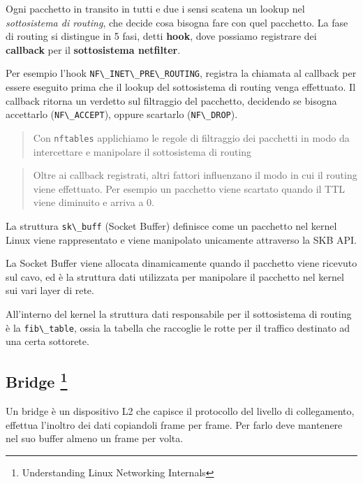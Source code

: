 Ogni pacchetto in transito in tutti e due i sensi scatena un lookup nel
\emph{sottosistema di routing}, che decide cosa bisogna fare con quel
pacchetto. La fase di routing si distingue in 5 fasi, detti
\textbf{hook}, dove possiamo registrare dei \textbf{callback} per il
\textbf{sottosistema netfilter}.

Per esempio l'hook \passthrough{\lstinline!NF\_INET\_PRE\_ROUTING!},
registra la chiamata al callback per essere eseguito prima che il lookup
del sottosistema di routing venga effettuato. Il callback ritorna un
verdetto sul filtraggio del pacchetto, decidendo se bisogna accettarlo
(\passthrough{\lstinline!NF\_ACCEPT!}), oppure scartarlo
(\passthrough{\lstinline!NF\_DROP!}).

\begin{quote}
Con \passthrough{\lstinline!nftables!} applichiamo le regole di
filtraggio dei pacchetti in modo da intercettare e manipolare il
sottosistema di routing
\end{quote}

\begin{quote}
Oltre ai callback registrati, altri fattori influenzano il modo in cui
il routing viene effettuato. Per esempio un pacchetto viene scartato
quando il TTL viene diminuito e arriva a 0.
\end{quote}

La struttura \passthrough{\lstinline!sk\_buff!} (Socket Buffer)
definisce come un pacchetto nel kernel Linux viene rappresentato e viene
manipolato unicamente attraverso la SKB API.

La Socket Buffer viene allocata dinamicamente quando il pacchetto viene
ricevuto sul cavo, ed è la struttura dati utilizzata per manipolare il
pacchetto nel kernel sui vari layer di rete.

All'interno del kernel la struttura dati responsabile per il
sottosistema di routing è la \passthrough{\lstinline!fib\_table!}, ossia
la tabella che raccoglie le rotte per il traffico destinato ad una certa
sottorete.

\subsection[Bridge ]{\texorpdfstring{Bridge
\footnote{\label{fn:ref_24}Understanding Linux Networking Internals}}{Bridge }}\label{bridge-2}

Un bridge è un dispositivo L2 che capisce il protocollo del livello di
collegamento, effettua l'inoltro dei dati copiandoli frame per frame.
Per farlo deve mantenere nel suo buffer almeno un frame per volta.

